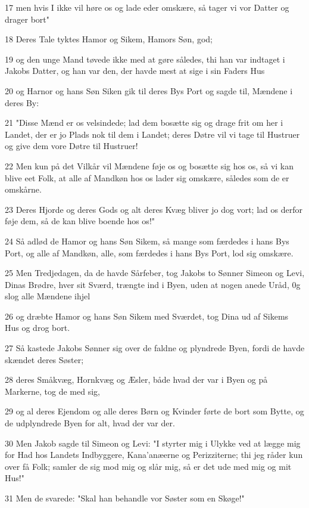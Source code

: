\par 17 men hvis I ikke vil høre os og lade eder omskære, så tager vi vor Datter og drager bort"
\par 18 Deres Tale tyktes Hamor og Sikem, Hamors Søn, god;
\par 19 og den unge Mand tøvede ikke med at gøre således, thi han var indtaget i Jakobs Datter, og han var den, der havde mest at sige i sin Faders Hus
\par 20 og Harnor og hans Søn Siken gik til deres Bys Port og sagde til, Mændene i deres By:
\par 21 "Disse Mænd er os velsindede; lad dem bosætte sig og drage frit om her i Landet, der er jo Plads nok til dem i Landet; deres Døtre vil vi tage til Hustruer og give dem vore Døtre til Hustruer!
\par 22 Men kun på det Vilkår vil Mændene føje os og bosætte sig hos os, så vi kan blive eet Folk, at alle af Mandkøn hos os lader sig omskære, således som de er omskårne.
\par 23 Deres Hjorde og deres Gods og alt deres Kvæg bliver jo dog vort; lad os derfor føje dem, så de kan blive boende hos os!"
\par 24 Så adlød de Hamor og hans Søn Sikem, så mange som færdedes i hans Bys Port, og alle af Mandkøn, alle, som færdedes i hans Bys Port, lod sig omskære.
\par 25 Men Tredjedagen, da de havde Sårfeber, tog Jakobs to Sønner Simeon og Levi, Dinas Brødre, hver sit Sværd, trængte ind i Byen, uden at nogen anede Uråd, 0g slog alle Mændene ihjel
\par 26 og dræbte Hamor og hans Søn Sikem med Sværdet, tog Dina ud af Sikems Hus og drog bort.
\par 27 Så kastede Jakobs Sønner sig over de faldne og plyndrede Byen, fordi de havde skændet deres Søster;
\par 28 deres Småkvæg, Hornkvæg og Æsler, både hvad der var i Byen og på Markerne, tog de med sig,
\par 29 og al deres Ejendom og alle deres Børn og Kvinder førte de bort som Bytte, og de udplyndrede Byen for alt, hvad der var der.
\par 30 Men Jakob sagde til Simeon og Levi: "I styrter mig i Ulykke ved at lægge mig for Had hos Landets Indbyggere, Kana'anæerne og Perizziterne; thi jeg råder kun over få Folk; samler de sig mod mig og slår mig, så er det ude med mig og mit Hus!"
\par 31 Men de svarede: "Skal han behandle vor Søster som en Skøge!"

